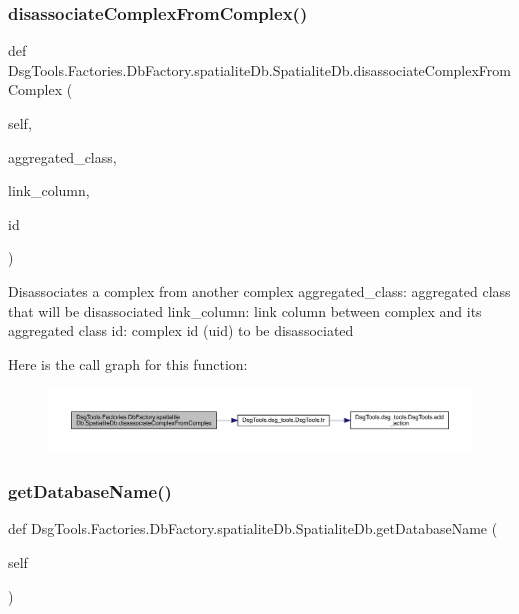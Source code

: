 \subsubsection{\texorpdfstring{disassociate\+Complex\+From\+Complex()}{disassociateComplexFromComplex()}}
{\footnotesize\ttfamily def Dsg\+Tools.\+Factories.\+Db\+Factory.\+spatialite\+Db.\+Spatialite\+Db.\+disassociate\+Complex\+From\+Complex (\begin{DoxyParamCaption}\item[{}]{self,  }\item[{}]{aggregated\+\_\+class,  }\item[{}]{link\+\_\+column,  }\item[{}]{id }\end{DoxyParamCaption})}

\begin{DoxyVerb}Disassociates a complex from another complex
aggregated_class: aggregated class that will be disassociated
link_column: link column between complex and its aggregated class
id: complex id (uid) to be disassociated
\end{DoxyVerb}
 Here is the call graph for this function\+:
\nopagebreak
\begin{figure}[H]
\begin{center}
\leavevmode
\includegraphics[width=350pt]{class_dsg_tools_1_1_factories_1_1_db_factory_1_1spatialite_db_1_1_spatialite_db_ad44549f7cd859c8e5599f35e9effc72c_cgraph}
\end{center}
\end{figure}
\mbox{\label{class_dsg_tools_1_1_factories_1_1_db_factory_1_1spatialite_db_1_1_spatialite_db_a3cf37bff5d32a7dd524eef7d0dd6d272}} 
\subsubsection{\texorpdfstring{get\+Database\+Name()}{getDatabaseName()}}
{\footnotesize\ttfamily def Dsg\+Tools.\+Factories.\+Db\+Factory.\+spatialite\+Db.\+Spatialite\+Db.\+get\+Database\+Name (\begin{DoxyParamCaption}\item[{}]{self }\end{DoxyParamCaption})}

